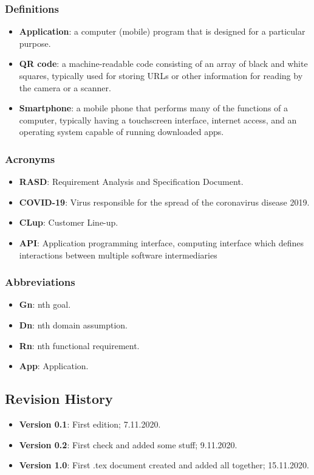 \subsubsection{Definitions}
\begin{itemize}
	\item \textbf{Application}: a computer (mobile) program that is designed for a particular purpose. 
	\item \textbf{QR code}: a machine-readable code consisting of an array of black and white squares, typically used for storing URLs or other information for reading by the camera or a scanner. 
	\item \textbf{Smartphone}: a mobile phone that performs many of the functions of a computer, typically having a touchscreen interface, internet access, and an operating system capable of running downloaded apps. 
\end{itemize}
\subsubsection{Acronyms}
\begin{itemize}
	\item \textbf{RASD}: Requirement Analysis and Specification Document. 
	\item \textbf{COVID-19}: Virus responsible for the spread of the coronavirus disease 2019. 
	\item \textbf{CLup}: Customer Line-up. 
	\item \textbf{API}: Application programming interface, computing interface which defines interactions between multiple software intermediaries 
\end{itemize}
\subsubsection{Abbreviations}
\begin{itemize}
	\item \textbf{Gn}: nth goal.
	\item \textbf{Dn}: nth domain assumption.
	\item \textbf{Rn}: nth functional requirement.
	\item \textbf{App}: Application.
\end{itemize}

\newpage
\subsection{Revision History}
\begin{itemize}
	\item \textbf{Version 0.1}: First edition; 7.11.2020.
	\item \textbf{Version 0.2}: First check and added some stuff; 9.11.2020.
	\item \textbf{Version 1.0}: First .tex document created and added all together; 15.11.2020.
\end{itemize}

